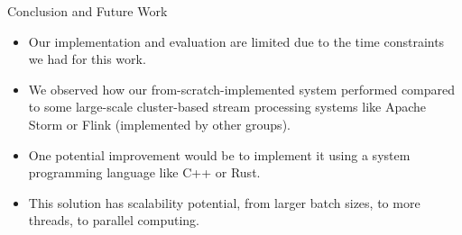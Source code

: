 \documentclass[9pt]{beamer}
\begin{document}
\begin{frame}[fragile]{Conclusion and Future Work}
    \begin{itemize}
        \item Our implementation and evaluation are limited due to the time constraints we had for this work.
        
        \item We observed how our from-scratch-implemented system performed compared to some large-scale cluster-based stream processing systems like Apache Storm or Flink (implemented by other groups).
        
        \item One potential improvement would be to implement it using a system programming language like C++ or Rust.
        
        \item This solution has scalability potential, from larger batch sizes, to more threads, to parallel computing. 
    \end{itemize}

    
    

\end{frame}





    

\end{document}

